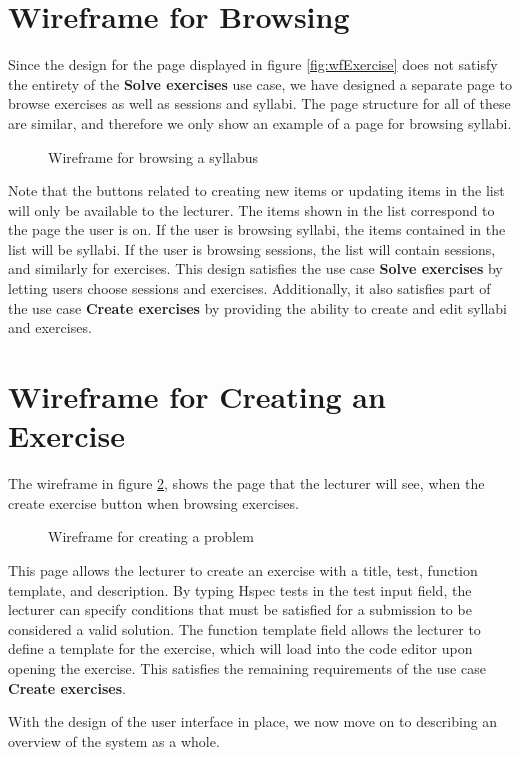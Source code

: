 \section{Wireframe for Browsing}
Since the design for the page displayed in figure \ref{fig:wfExercise} does not satisfy the entirety of the \textbf{Solve exercises} use case, we have designed a separate page to browse exercises as well as sessions and syllabi. The page structure for all of these are similar, and therefore we only show an example of a page for browsing syllabi.

\begin{figure}[H]
    \centering
    \caption{Wireframe for browsing a syllabus}
    \label{fig:wfSyllabus}
\end{figure}
Note that the buttons related to creating new items or updating items in the list will only be available to the lecturer. The items shown in the list correspond to the page the user is on. If the user is browsing syllabi, the items contained in the list will be syllabi. If the user is browsing sessions, the list will contain sessions, and similarly for exercises. This design satisfies the use case \textbf{Solve exercises} by letting users choose sessions and exercises. Additionally, it also satisfies part of the use case \textbf{Create exercises} by providing the ability to create and edit syllabi and exercises.

\section{Wireframe for Creating an Exercise}
The wireframe in figure \ref{fig:wfProblem}, shows the page that the lecturer will see, when the create exercise button when browsing exercises.
\begin{figure}[H]
	\centering
	\caption{Wireframe for creating a problem}
	\label{fig:wfProblem}
\end{figure}

This page allows the lecturer to create an exercise with a title, test, function template, and description.
By typing Hspec tests in the test input field, the lecturer can specify conditions that must be satisfied for a submission to be considered a valid solution.
The function template field allows the lecturer to define a template for the exercise, which will load into the code editor upon opening the exercise.
This satisfies the remaining requirements of the use case \textbf{Create exercises}.

With the design of the user interface in place, we now move on to describing an overview of the system as a whole.
